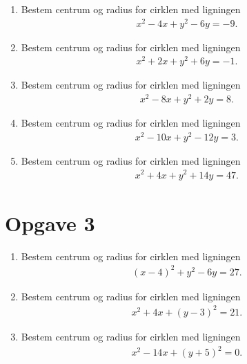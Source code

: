 \begin{enumerate}[label=\roman*)]
	\item Bestem centrum og radius for cirklen med ligningen
	\begin{align*}
		x^2 - 4 x + y^2 - 6 y= -9.
	\end{align*}
	\item Bestem centrum og radius for cirklen med ligningen
	\begin{align*}
		x^2 + 2 x + y^2 + 6 y = -1.
	\end{align*}
	\item Bestem centrum og radius for cirklen med ligningen
	\begin{align*}
		x^2 - 8 x + y^2 + 2 y  = 8.
	\end{align*}
	\item Bestem centrum og radius for cirklen med ligningen
	\begin{align*}
		x^2 - 10 x + y^2 - 12 y  = 3.
	\end{align*}
	\item Bestem centrum og radius for cirklen med ligningen
	\begin{align*}
		x^2 + 4 x + y^2 + 14 y = 47.
	\end{align*}
	
\end{enumerate}

\section*{Opgave 3}

\begin{enumerate}[label=\roman*)]
	\item Bestem centrum og radius for cirklen med ligningen
	\begin{align*}
		(x-4)^2+y^2-6y = 27.
	\end{align*}
	\item Bestem centrum og radius for cirklen med ligningen
	\begin{align*}
		x^2+4x+(y-3)^2 = 21.
	\end{align*}
	\item Bestem centrum og radius for cirklen med ligningen
	\begin{align*}
		x^2-14x+(y+5)^2 = 0.
	\end{align*}
\end{enumerate}
